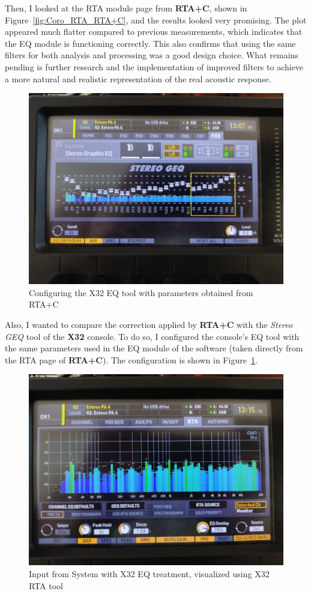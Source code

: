 Then, I looked at the RTA module page from \textbf{RTA+C}, shown in Figure~\ref{fig:Coro_RTA_RTA+C}, and the results looked very promising. The plot appeared much flatter compared to previous measurements, which indicates that the EQ module is functioning correctly. This also confirms that using the same filters for both analysis and processing was a good design choice. What remains pending is further research and the implementation of improved filters to achieve a more natural and realistic representation of the real acoustic response.

\begin{figure}[H]
	\centering
	\includegraphics[width=0.8
	\linewidth]{Figures/Coro_X32_EQ.jpeg}
	\caption{Configuring the X32 EQ tool with parameters obtained from RTA+C}
	\label{fig:Coro_X32_EQ}
\end{figure}

Also, I wanted to compare the correction applied by \textbf{RTA+C} with the \textit{Stereo GEQ} tool of the \textbf{X32} console. To do so, I configured the console's EQ tool with the same parameters used in the EQ module of the software (taken directly from the RTA page of \textbf{RTA+C}). The configuration is shown in Figure~\ref{fig:Coro_X32_EQ}.

\begin{figure}[H]
	\centering
	\includegraphics[width=0.8
	\linewidth]{Figures/Coro_X32_treatedX32.jpeg}
	\caption{Input from System with X32 EQ treatment, visualized using X32 RTA tool}
	\label{fig:Coro_X32_treatedX32}
\end{figure}


